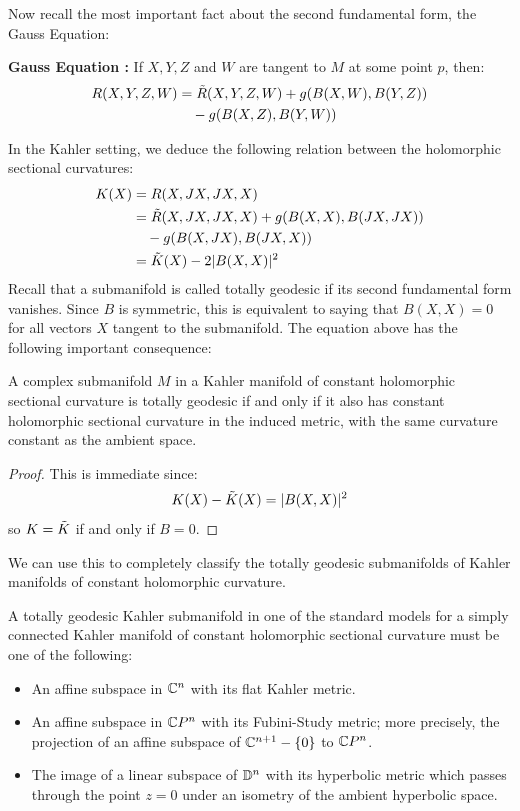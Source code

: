 Now recall the most important fact about the second fundamental form, the Gauss Equation:

{ \bf Gauss Equation : } If $X,Y,Z$ and $W$ are tangent to $M$ at some point $p$, then:
%
\begin{align*}
 R(X,Y,Z,W) &= \tilde{R} (X,Y,Z,W) + g( B(X,W), B(Y,Z) ) \\
& \quad - g( B(X,Z), B(Y,W) ) 
\end{align*}

In the Kahler setting, we deduce the following relation between the holomorphic sectional curvatures:
%
\begin{align*}
K(X) &= R(X,JX,JX,X) \\
&= \tilde{R} (X,JX,JX,X) + g( B(X,X), B(JX,JX) ) \\
& \quad - g( B(X,JX), B(JX,X) ) \\
&= \tilde{K} (X) - 2 | B(X,X) |^2
\end{align*}
%
Recall that a submanifold is called totally geodesic if its second fundamental form vanishes.  Since $B$ is symmetric, this is equivalent to saying that $B(X,X) = 0$ for all vectors $X$ tangent to the submanifold.  The equation above has the following important consequence:

\begin{prop}
A complex submanifold $M$ in a Kahler manifold of constant holomorphic sectional curvature is totally geodesic if and only if it also has constant holomorphic sectional curvature in the induced metric, with the same curvature constant as the ambient space.
\end{prop}

\begin{proof}
This is immediate since:
%
$$ K(X) - \tilde{K} (X) = |B(X,X)|^2 $$
%
so $K = \tilde{K}$ if and only if $B = 0$.
\end{proof}

We can use this to completely classify the totally geodesic submanifolds of Kahler manifolds of constant holomorphic curvature.

\begin{prop}  A totally geodesic Kahler submanifold in one of the standard models for a simply connected Kahler manifold of constant holomorphic sectional curvature must be one of the following:
%
\begin{itemize}
%
\item An affine subspace in $\mathbb{C}^n$ with its flat Kahler metric.
\item An affine subspace in $\mathbb{C}P^n$ with its Fubini-Study metric; more precisely, the projection of an affine subspace of $\mathbb{C}^{n+1} - \{0\}$ to $\mathbb{C}P^n$.
\item The image of a linear subspace of $\mathbb{D}^n$ with its hyperbolic metric which passes through the point $z = 0$ under an isometry of the ambient hyperbolic space.
%
\end{itemize}
%
\end{prop}

